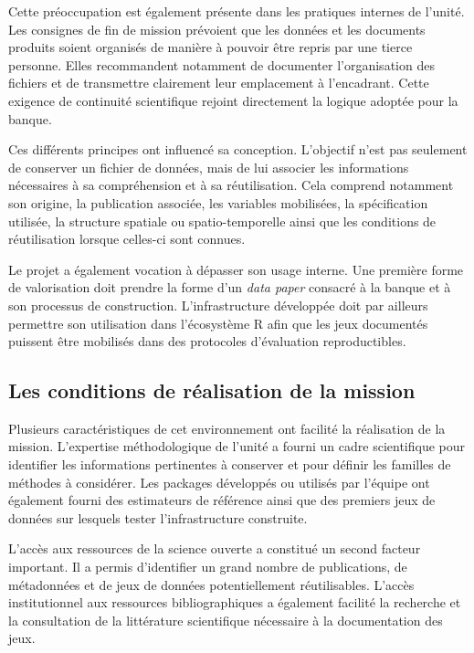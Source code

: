 \documentclass[11pt,a4paper]{article}
\begin{document}
Cette préoccupation est également présente dans les pratiques internes de l'unité. Les consignes de fin de mission prévoient que les données et les documents produits soient organisés de manière à pouvoir être repris par une tierce personne. Elles recommandent notamment de documenter l'organisation des fichiers et de transmettre clairement leur emplacement à l'encadrant. Cette exigence de continuité scientifique rejoint directement la logique adoptée pour la banque.

Ces différents principes ont influencé sa conception. L'objectif n'est pas seulement de conserver un fichier de données, mais de lui associer les informations nécessaires à sa compréhension et à sa réutilisation. Cela comprend notamment son origine, la publication associée, les variables mobilisées, la spécification utilisée, la structure spatiale ou spatio-temporelle ainsi que les conditions de réutilisation lorsque celles-ci sont connues.

Le projet a également vocation à dépasser son usage interne. Une première forme de valorisation doit prendre la forme d'un \textit{data paper} consacré à la banque et à son processus de construction. L'infrastructure développée doit par ailleurs permettre son utilisation dans l'écosystème R afin que les jeux documentés puissent être mobilisés dans des protocoles d'évaluation reproductibles.


\subsection{Les conditions de réalisation de la mission}

Plusieurs caractéristiques de cet environnement ont facilité la réalisation de la mission. L'expertise méthodologique de l'unité a fourni un cadre scientifique pour identifier les informations pertinentes à conserver et pour définir les familles de méthodes à considérer. Les packages développés ou utilisés par l'équipe ont également fourni des estimateurs de référence ainsi que des premiers jeux de données sur lesquels tester l'infrastructure construite.

L'accès aux ressources de la science ouverte a constitué un second facteur important. Il a permis d'identifier un grand nombre de publications, de métadonnées et de jeux de données potentiellement réutilisables. L'accès institutionnel aux ressources bibliographiques a également facilité la recherche et la consultation de la littérature scientifique nécessaire à la documentation des jeux.
\end{document}
